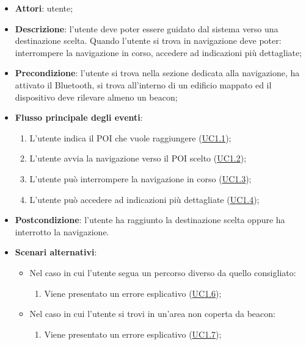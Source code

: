 \documentclass[../AnalisiDeiRequisiti.tex]{subfiles}
\begin{document}
\begin{itemize}
\item \textbf{Attori}: utente;
\item \textbf{Descrizione}: l'utente deve poter essere guidato dal sistema verso una destinazione scelta. Quando l'utente si trova in navigazione deve poter: interrompere la navigazione in corso, accedere ad indicazioni più dettagliate; 
      \item \textbf{Precondizione}: l'utente si trova nella sezione dedicata alla navigazione, ha attivato il Bluetooth, si trova all'interno di un edificio mappato ed il dispositivo deve rilevare almeno un beacon;

        \item \textbf{Flusso principale degli eventi}:
          \begin{enumerate}
          \item L'utente indica il POI che vuole raggiungere (\hyperlink{UC1.1}{UC1.1});
          \item L'utente avvia la navigazione verso il POI scelto (\hyperlink{UC1.2}{UC1.2});
          \item L'utente può interrompere la navigazione in corso  (\hyperlink{UC1.3}{UC1.3});
          \item L'utente può accedere ad indicazioni più dettagliate  (\hyperlink{UC1.4}{UC1.4});

      \end{enumerate}
    \item \textbf{Postcondizione}: l'utente ha raggiunto la destinazione scelta oppure ha interrotto la navigazione.
     \item \textbf{Scenari alternativi}: 
      \begin{itemize}
       \item Nel caso in cui l'utente segua un percorso diverso da quello consigliato: 
       \begin{enumerate}
          \item Viene presentato un errore esplicativo (\hyperlink{UC1.6}{UC1.6});
       \end{enumerate}
       \item Nel caso in cui l'utente si trovi in un'area non coperta da beacon: 
       \begin{enumerate}
          \item Viene presentato un errore esplicativo (\hyperlink{UC1.7}{UC1.7});
       \end{enumerate}
      \end{itemize}
  \end{itemize}
\hypertarget{UC1.1}{}
\end{document}
